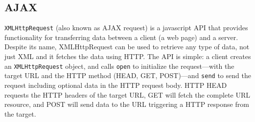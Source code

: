 \documentclass[12pt,twoside]{book}
\begin{document}


\subsection{AJAX}

\texttt{XMLHttpRequest} (also known as AJAX request) is a javascript API that provides %
functionality for transferring data between a client (a web page) and a server. Despite its name, XMLHttpRequest can be used to retrieve any type of data, not just XML and it fetches the data using HTTP.%
The API is simple: a client creates an \texttt{XMLHttpRequest} object, and calls \texttt{open} to initialize the request---with the target URL and the HTTP method (HEAD, GET, POST)---and \texttt{send} to send the request including optional data in the HTTP request body. HTTP HEAD requests the HTTP headers of the target URL, GET will fetch the complete URL resource, and POST will send data to the URL triggering a HTTP response from the target.
\end{document}
